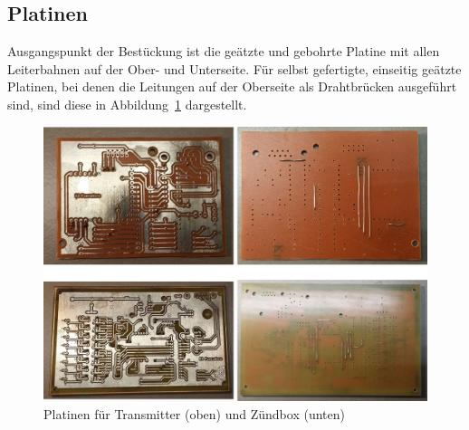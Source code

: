 \documentclass[paper=a4, parskip, numbers=noenddot, toc=listof, headsepline]{scrbook}
\begin{document}
		  \subsection{Platinen}

			  Ausgangspunkt der Bestückung ist die geätzte und gebohrte Platine mit allen Leiterbahnen auf der Ober- und Unterseite. Für selbst gefertigte, einseitig geätzte Platinen, bei denen die Leitungen auf der Oberseite als Drahtbrücken ausgeführt sind, sind diese in Abbildung~\ref{fig:platinen} dargestellt.

			  \begin{figure}[t]
				  \centering
				  \includegraphics[width=\textwidth]{bilder/platinen}
				  \caption{Platinen für Transmitter (oben) und Zündbox (unten)}
				  \label{fig:platinen}
			  \end{figure}
\end{document}
